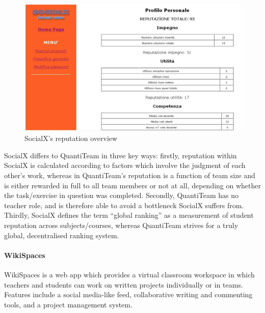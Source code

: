 \begin{figure}[htbp]
\centering
\includegraphics{../screenshots/socialx.png}
\caption{SocialX's reputation overview}
\end{figure}

SocialX differs to QuantiTeam in three key ways: firstly, reputation
within SocialX is calculated according to factors which involve the
judgment of each other's work, whereas in QuantiTeam's reputation is a
function of team size and is either rewarded in full to all team members
or not at all, depending on whether the task/exercise in question was
completed. Secondly, QuantiTeam has no teacher role, and is therefore
able to avoid a bottleneck SocialX suffers from. Thirdly, SocialX
defines the term ``global ranking'' as a measurement of student
reputation across subjects/courses, whereas QuantiTeam strives for a
truly global, decentralised ranking system.

\paragraph{WikiSpaces}\label{wikispaces}

WikiSpaces\cite{1wikispaces} is a web app which provides a virtual classroom workspace in
which teachers and students can work on written projects individually or
in teams. Features include a social media-like feed, collaborative
writing and commenting tools, and a project management system.

